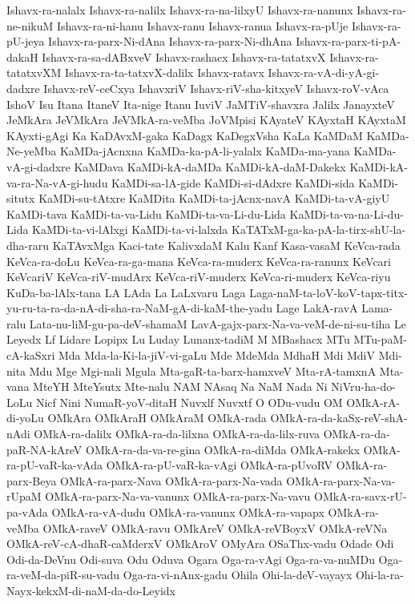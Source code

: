 {Ishavx-ra-nalalx
Ishavx-ra-nalilx
Ishavx-ra-na-lilxyU
Ishavx-ra-nanunx
Ishavx-ra-ne-nikuM
Ishavx-ra-ni-hanu
Ishavx-ranu
Ishavx-ranua
Ishavx-ra-pUje
Ishavx-ra-pU-jeya
Ishavx-ra-parx-Ni-dAna
Ishavx-ra-parx-Ni-dhAna
Ishavx-ra-parx-ti-pA-dakaH
Ishavx-ra-sa-dABxveV
Ishavx-rashacx
Ishavx-ra-tatatxvX
Ishavx-ra-tatatxvXM
Ishavx-ra-ta-tatxvX-dalilx
Ishavx-ratavx
Ishavx-ra-vA-di-yA-gi-dadxre
Ishavx-reV-ceCxya
IshavxriV
Ishavx-riV-sha-kitxyeV
Ishavx-roV-vAca
IshoV
Isu
Itana
ItaneV
Ita-nige
Itanu
IuviV
JaMTiV-shavxra
Jalilx
JanayxteV
JeMkAra
JeVMkAra
JeVMkA-ra-veMba
JoVMpisi
KAyateV
KAyxtaH
KAyxtaM
KAyxti-gAgi
Ka
KaDAvxM-gaka
KaDagx
KaDegxVsha
KaLa
KaMDaM
KaMDa-Ne-yeMba
KaMDa-jAcnxna
KaMDa-ka-pA-li-yalalx
KaMDa-ma-yana
KaMDa-vA-gi-dadxre
KaMDava
KaMDi-kA-daMDa
KaMDi-kA-daM-Dakekx
KaMDi-kA-va-ra-Na-vA-gi-hudu
KaMDi-sa-lA-gide
KaMDi-si-dAdxre
KaMDi-sida
KaMDi-situtx
KaMDi-su-tAtxre
KaMDita
KaMDi-ta-jAcnx-navA
KaMDi-ta-vA-giyU
KaMDi-tava
KaMDi-ta-va-Lidu
KaMDi-ta-va-Li-du-Lida
KaMDi-ta-va-na-Li-du-Lida
KaMDi-ta-vi-lAlxgi
KaMDi-ta-vi-lalxda
KaTATxM-ga-ka-pA-la-tirx-shU-la-dha-raru
KaTAvxMga
Kaci-tate
KalivxdaM
Kalu
Kanf
Kasa-vasaM
KeVca-rada
KeVca-ra-doLu
KeVca-ra-ga-mana
KeVca-ra-muderx
KeVca-ra-ranunx
KeVcari
KeVcariV
KeVca-riV-mudArx
KeVca-riV-muderx
KeVca-ri-muderx
KeVca-riyu
KuDa-ba-lAlx-tana
LA
LAda
La
LaLxvaru
Laga
Laga-naM-ta-loV-koV-tapx-titx-yu-ru-ta-ra-da-nA-di-sha-ra-NaM-gA-di-kaM-the-yadu
Lage
LakA-ravA
Lama-ralu
Lata-nu-liM-gu-pa-deV-shamaM
LavA-gajx-parx-Na-va-veM-de-ni-su-tiha
Le
Leyedx
Lf
Lidare
Lopipx
Lu
Luday
Lunanx-tadiM
M
MBashacx
MTu
MTu-paM-cA-kaSxri
Mda
Mda-la-Ki-la-jiV-vi-gaLu
Mde
MdeMda
MdhaH
Mdi
MdiV
Mdi-nita
Mdu
Mge
Mgi-nali
Mgula
Mta-gaR-ta-barx-hamxveV
Mta-rA-tamxnA
Mta-vana
MteYH
MteYsutx
Mte-nalu
NAM
NAsaq
Na
NaM
Nada
Ni
NiVru-ha-do-LoLu
Nicf
Nini
NumaR-yoV-ditaH
Nuvxlf
Nuvxtf
O
ODu-vudu
OM
OMkA-rA-di-yoLu
OMkAra
OMkAraH
OMkAraM
OMkA-rada
OMkA-ra-da-kaSx-reV-shA-nAdi
OMkA-ra-dalilx
OMkA-ra-da-lilxna
OMkA-ra-da-lilx-ruva
OMkA-ra-da-paR-NA-kAreV
OMkA-ra-da-va-re-gina
OMkA-ra-diMda
OMkA-rakekx
OMkA-ra-pU-vaR-ka-vAda
OMkA-ra-pU-vaR-ka-vAgi
OMkA-ra-pUvoRV
OMkA-ra-parx-Beya
OMkA-ra-parx-Nava
OMkA-ra-parx-Na-vada
OMkA-ra-parx-Na-va-rUpaM
OMkA-ra-parx-Na-va-vanunx
OMkA-ra-parx-Na-vavu
OMkA-ra-savx-rU-pa-vAda
OMkA-ra-vA-dudu
OMkA-ra-vanunx
OMkA-ra-vapapx
OMkA-ra-veMba
OMkA-raveV
OMkA-ravu
OMkAreV
OMkA-reVBoyxV
OMkA-reVNa
OMkA-reV-cA-dhaR-caMderxV
OMkAroV
OMyAra
OSaThx-vadu
Odade
Odi
Odi-da-DeVnu
Odi-suva
Odu
Oduva
Ogara
Oga-ra-vAgi
Oga-ra-va-nuMDu
Oga-ra-veM-da-piR-su-vadu
Oga-ra-vi-nAnx-gadu
Ohila
Ohi-la-deV-vayayx
Ohi-la-ra-Nayx-kekxM-di-naM-da-do-Leyidx
}
